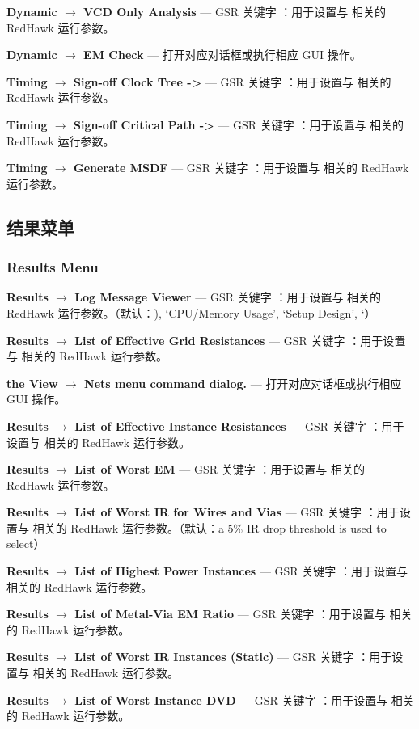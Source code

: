 \textbf{Dynamic $\rightarrow$ VCD Only Analysis} — GSR 关键字 ：用于设置与  相关的 RedHawk 运行参数。

\textbf{Dynamic $\rightarrow$ EM Check} — 打开对应对话框或执行相应 GUI 操作。

\textbf{Timing $\rightarrow$ Sign-off Clock Tree ->} — GSR 关键字 ：用于设置与  相关的 RedHawk 运行参数。

\textbf{Timing $\rightarrow$ Sign-off Critical Path ->} — GSR 关键字 ：用于设置与  相关的 RedHawk 运行参数。

\textbf{Timing $\rightarrow$ Generate MSDF} — GSR 关键字 ：用于设置与  相关的 RedHawk 运行参数。

\subsection{结果菜单}
\subsubsection*{Results Menu}

\textbf{Results $\rightarrow$ Log Message Viewer} — GSR 关键字 ：用于设置与  相关的 RedHawk 运行参数。（默认：), ‘CPU/Memory Usage’, ‘Setup Design’, ‘）

\textbf{Results $\rightarrow$ List of Effective Grid Resistances} — GSR 关键字 ：用于设置与  相关的 RedHawk 运行参数。

\textbf{the View $\rightarrow$ Nets menu command dialog.} — 打开对应对话框或执行相应 GUI 操作。

\textbf{Results $\rightarrow$ List of Effective Instance Resistances} — GSR 关键字 ：用于设置与  相关的 RedHawk 运行参数。

\textbf{Results $\rightarrow$ List of Worst EM} — GSR 关键字 ：用于设置与  相关的 RedHawk 运行参数。

\textbf{Results $\rightarrow$ List of Worst IR for Wires and Vias} — GSR 关键字 ：用于设置与  相关的 RedHawk 运行参数。（默认：a 5\% IR drop threshold is used to select）

\textbf{Results $\rightarrow$ List of Highest Power Instances} — GSR 关键字 ：用于设置与  相关的 RedHawk 运行参数。

\textbf{Results $\rightarrow$ List of Metal-Via EM Ratio} — GSR 关键字 ：用于设置与  相关的 RedHawk 运行参数。

\textbf{Results $\rightarrow$ List of Worst IR Instances (Static)} — GSR 关键字 ：用于设置与  相关的 RedHawk 运行参数。

\textbf{Results $\rightarrow$ List of Worst Instance DVD} — GSR 关键字 ：用于设置与  相关的 RedHawk 运行参数。

